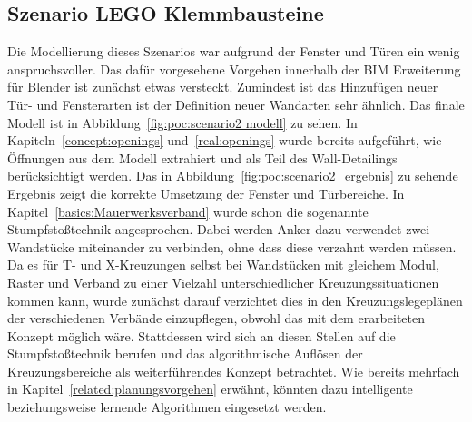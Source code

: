 \subsection{Szenario LEGO Klemmbausteine}\label{poc:scenario2}
Die Modellierung dieses Szenarios war aufgrund der Fenster und Türen ein wenig anspruchsvoller.
Das dafür vorgesehene Vorgehen innerhalb der BIM Erweiterung für Blender ist zunächst etwas versteckt.
Zumindest ist das Hinzufügen neuer Tür- und Fensterarten ist der Definition neuer Wandarten sehr ähnlich.
Das finale Modell ist in Abbildung~\ref{fig:poc:scenario2 modell} zu sehen.
In Kapiteln~\ref{concept:openings} und~\ref{real:openings} wurde bereits aufgeführt, wie Öffnungen aus dem Modell extrahiert und als Teil des Wall-Detailings berücksichtigt werden.
Das in Abbildung~\ref{fig:poc:scenario2_ergebnis} zu sehende Ergebnis zeigt die korrekte Umsetzung der Fenster und Türbereiche.
In Kapitel~\ref{basics:Mauerwerksverband} wurde schon die sogenannte Stumpfstoßtechnik angesprochen.
Dabei werden Anker dazu verwendet zwei Wandstücke miteinander zu verbinden, ohne dass diese verzahnt werden müssen.
Da es für T- und X-Kreuzungen selbst bei Wandstücken mit gleichem Modul, Raster und Verband zu einer Vielzahl unterschiedlicher Kreuzungssituationen kommen kann, wurde zunächst darauf verzichtet dies in den Kreuzungslegeplänen der verschiedenen Verbände einzupflegen, obwohl das mit dem erarbeiteten Konzept möglich wäre.
Stattdessen wird sich an diesen Stellen auf die Stumpfstoßtechnik berufen und das algorithmische Auflösen der Kreuzungsbereiche als weiterführendes Konzept betrachtet.
Wie bereits mehrfach in Kapitel~\ref{related:planungsvorgehen} erwähnt, könnten dazu \glqq{}intelligente\grqq{} beziehungsweise lernende Algorithmen eingesetzt werden.

